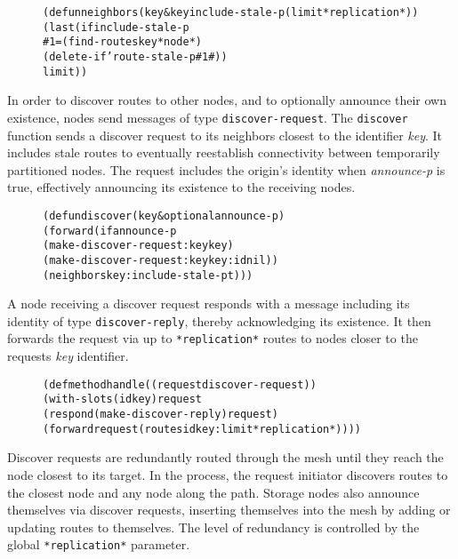 \documentclass [a4paper,12pt,oneside]{article}\usepackage [paper=a4paper,left=37.5264mm,right=37.5264mm,top=37.5264mm,bottom=37.5264mm]{geometry}\usepackage {graphicx}\usepackage {tabularx}\usepackage {alltt}\usepackage {float}\usepackage [section]{placeins}\usepackage {titling}\setlength {\droptitle }{-4em}\pretitle {\begin {flushright}\bfseries \LARGE }\posttitle {\end {flushright}}\preauthor {\begin {flushright}}\postauthor {\end {flushright}}\predate {\begin {flushright}}\postdate {\end {flushright}}\usepackage [english]{babel}\usepackage [T1]{fontenc}\usepackage [utf8x]{inputenc}\usepackage {stmaryrd}\usepackage {amsfonts}\DeclareUnicodeCharacter {12314}{$\llbracket $}\DeclareUnicodeCharacter {12315}{$\rrbracket $}\DeclareUnicodeCharacter {9655}{$\rhd $}\newcommand \nobreakdash {\mbox {-}}\DeclareUnicodeCharacter {8209}{\nobreakdash }\usepackage [sc]{mathpazo}\linespread {1.05}\usepackage [font={small},labelformat=empty,labelsep=none]{caption}\tolerance=10000 \clubpenalty=10000 \widowpenalty=10000 \frenchspacing
\begin{document}
\begin {figure}[H]\centering \begin {alltt}
(defun neighbors (key \&key include-stale-p (limit *replication*))
  (last (if include-stale-p
            \#1=(find-routes key *node*)
            (delete-if 'route-stale-p \#1\#))
        limit))
\end{alltt}\vspace {-1em}\end {figure}

In order to discover routes to other nodes, and to optionally announce their own existence, nodes send messages of type \texttt {discover-request}. The \texttt {discover} function sends a discover request to its neighbors closest to the identifier \textit {key}. It includes stale routes to eventually reestablish connectivity between temporarily partitioned nodes. The request includes the origin’s identity when \textit {announce-p} is true, effectively announcing its existence to the receiving nodes.

\begin {figure}[H]\centering \begin {alltt}
(defun discover (key \&optional announce-p)
  (forward (if announce-p
               (make-discover-request :key key)
               (make-discover-request :key key :id nil))
           (neighbors key :include-stale-p t)))
\end{alltt}\vspace {-1em}\end {figure}

A node receiving a discover request responds with a message including its identity of type \texttt {discover-reply}, thereby acknowledging its existence. It then forwards the request via up to \texttt {*replication*} routes to nodes closer to the requests \textit {key} identifier.

\begin {figure}[H]\centering \begin {alltt}
(defmethod handle ((request discover-request))
  (with-slots (id key) request
    (respond (make-discover-reply) request)
    (forward request (routes id key :limit *replication*))))
\end{alltt}\vspace {-1em}\end {figure}

Discover requests are redundantly routed through the mesh until they reach the node closest to its target. In the process, the request initiator discovers routes to the closest node and any node along the path. Storage nodes also announce themselves via discover requests, inserting themselves into the mesh by adding or updating routes to themselves. The level of redundancy is controlled by the global \texttt {*replication*} parameter.
\end{document}
